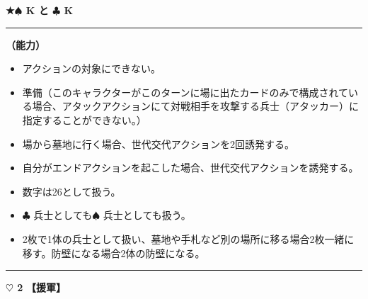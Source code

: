 \documentclass[twocolumn,a5paper,papersize,10pt]{jarticle}
\begin{document}
 
\vspace{2mm}
\begin{tcolorbox}[title={\small\bf【Character】魔王}{\scriptsize （兵士）}]

  {\scriptsize\bf ★{\normalsize $\spadesuit$} K と {\normalsize $\clubsuit$} K}

\vspace{1mm} %
\hrule height 0.1mm depth 0mm width 62mm %
\vspace{1mm} %

{\bf（能力）}


\vspace{-1zh}%
\begin{itemize}
\setlength{\leftskip}{-0.3cm}
\setlength{\parskip}{0pt} %

\item アクションの対象にできない。

\item 準備（このキャラクターがこのターンに場に出たカードのみで構成されている場合、アタックアクションにて対戦相手を攻撃する兵士（アタッカー）に指定することができない。）

\item 場から墓地に行く場合、世代交代アクションを2回誘発する。

\item 自分がエンドアクションを起こした場合、世代交代アクションを誘発する。

\item 数字は26として扱う。

\item {\normalsize $\clubsuit$} 兵士としても{\normalsize $\spadesuit$} 兵士としても扱う。

\item 2枚で1体の兵士として扱い、墓地や手札など別の場所に移る場合2枚一緒に移す。防壁になる場合2体の防壁になる。
\vspace{-1zh}%
\end{itemize}

\vspace{1mm} %
\end{tcolorbox}

\vspace{-1zh}

 
 
 
 

\vspace{3mm} %
\hrule height 0.5mm depth 0mm width 66.5mm %
\vspace{1mm} %
{\Large\bf $\heartsuit$ 2} {\normalsize\bf【援軍】} %
\vspace{1mm} %
\end{document}
